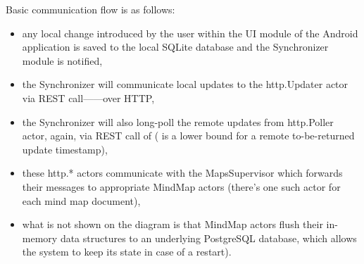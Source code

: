 Basic communication flow is as follows:

\begin{itemize}
	\item any local change introduced by the user within the UI module of the Android application is saved to the local SQLite database and the Synchronizer module is notified,
	\item the Synchronizer will communicate local updates to the http.Updater actor via REST call------over HTTP,
	\item the Synchronizer will also long-poll the remote updates from http.Poller actor, again, via REST call of  ( is a lower bound for a remote to-be-returned update timestamp),
  \item these http.* actors communicate with the MapsSupervisor which forwards their messages to appropriate MindMap actors (there's one such actor for each mind map document),
  \item what is not shown on the diagram is that MindMap actors flush their in-memory data structures to an underlying PostgreSQL database, which allows the system to keep its state in case of a restart).
\end{itemize}





